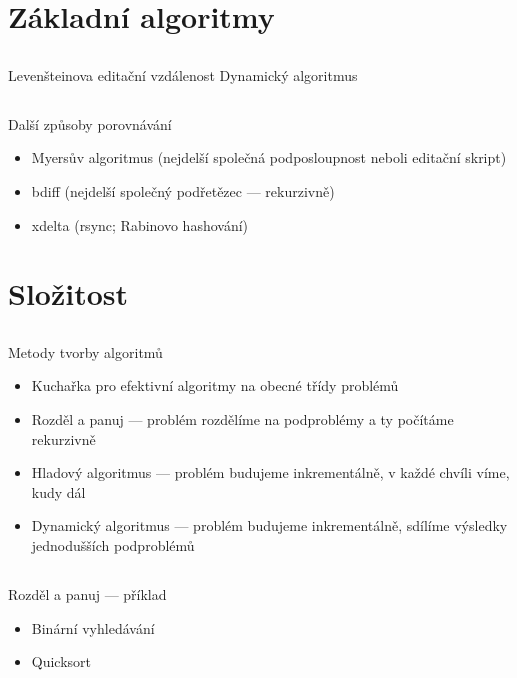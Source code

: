 \documentclass{beamer}
\begin{document}
\section{Základní algoritmy}

\subsection{}
\begin{frame}{Levenšteinova editační vzdálenost}
Dynamický algoritmus
\end{frame}

\subsection{}
\begin{frame}{Další způsoby porovnávání}
\begin{itemize}
\item Myersův algoritmus (nejdelší společná podposloupnost neboli editační skript)
\item bdiff (nejdelší společný podřetězec --- rekurzivně)
\item xdelta (rsync; Rabinovo hashování)
\end{itemize}
\end{frame}

\section{Složitost}

\subsection{}
\begin{frame}{Metody tvorby algoritmů}
\begin{itemize}
\item Kuchařka pro efektivní algoritmy na obecné třídy problémů
\item Rozděl a panuj --- problém rozdělíme na podproblémy a ty počítáme rekurzivně
\item Hladový algoritmus --- problém budujeme inkrementálně, v každé chvíli víme, kudy dál
\item Dynamický algoritmus --- problém budujeme inkrementálně, sdílíme výsledky jednodušších podproblémů
\end{itemize}
\end{frame}

\subsection{}
\begin{frame}{Rozděl a panuj --- příklad}
\begin{itemize}
\item Binární vyhledávání
\item Quicksort
\end{itemize}
\end{frame}
\end{document}
